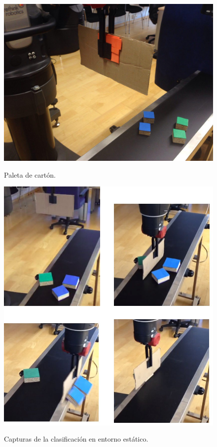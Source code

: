 \begin{figure}[H]
	\centering %
	\label{cd:paleta}
	\includegraphics[scale=0.23]{imagenes/paleta.jpg}
	\caption{Paleta de cartón.}
\end{figure}

\begin{figure}[H]
	\centering %
	\label{cd:ce}
	\includegraphics[scale=0.25]{imagenes/static.jpg}
	\caption{Capturas de la clasificación en entorno estático.}
\end{figure}

